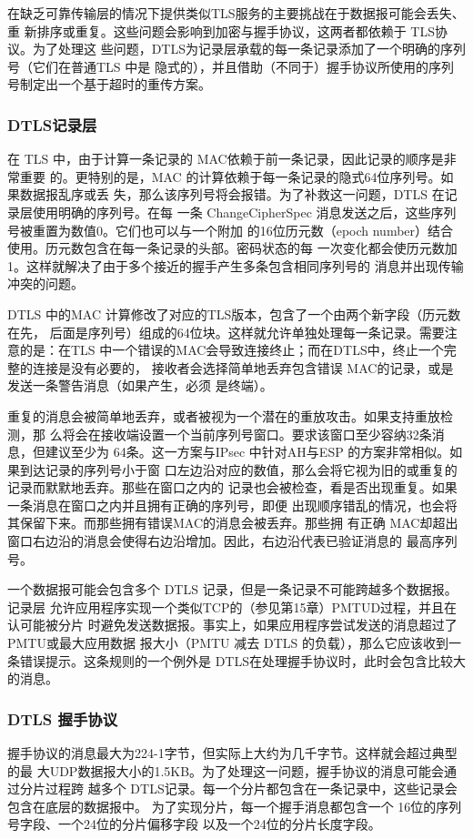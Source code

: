 在缺乏可靠传输层的情况下提供类似TLS服务的主要挑战在于数据报可能会丢失、重
新排序或重复。这些问题会影响到加密与握手协议，这两者都依赖于 TLS协议。为了处理这
些问题，DTLS为记录层承载的每一条记录添加了一个明确的序列号（它们在普通TLS 中是
隐式的），并且借助（不同于）握手协议所使用的序列号制定出一个基于超时的重传方案。
\subsubsection{DTLS记录层}
在 TLS 中，由于计算一条记录的 MAC依赖于前一条记录，因此记录的顺序是非常重要
的。更特别的是，MAC 的计算依赖于每一条记录的隐式64位序列号。如果数据报乱序或丢
失，那么该序列号将会报错。为了补救这一问题，DTLS 在记录层使用明确的序列号。在每
一条 ChangeCipherSpec 消息发送之后，这些序列号被重置为数值0。它们也可以与一个附加
的16位历元数（epoch number）结合使用。历元数包含在每一条记录的头部。密码状态的每
一次变化都会使历元数加1。这样就解决了由于多个接近的握手产生多条包含相同序列号的
消息并出现传输冲突的问题。

DTLS 中的MAC 计算修改了对应的TLS版本，包含了一个由两个新字段（历元数在先，
后面是序列号）组成的64位块。这样就允许单独处理每一条记录。需要注意的是：在TLS
中一个错误的MAC会导致连接终止；而在DTLS中，终止一个完整的连接是没有必要的，
接收者会选择简单地丢弃包含错误 MAC的记录，或是发送一条警告消息（如果产生，必须
是终端）。

重复的消息会被简单地丢弃，或者被视为一个潜在的重放攻击。如果支持重放检测，那
么将会在接收端设置一个当前序列号窗口。要求该窗口至少容纳32条消息，但建议至少为
64条。这一方案与IPsec 中针对AH与ESP 的方案非常相似。如果到达记录的序列号小于窗
口左边沿对应的数值，那么会将它视为旧的或重复的记录而默默地丢弃。那些在窗口之内的
记录也会被检查，看是否出现重复。如果一条消息在窗口之内并且拥有正确的序列号，即便
出现顺序错乱的情况，也会将其保留下来。而那些拥有错误MAC的消息会被丢弃。那些拥
有正确 MAC却超出窗口右边沿的消息会使得右边沿增加。因此，右边沿代表已验证消息的
最高序列号。

一个数据报可能会包含多个 DTLS 记录，但是一条记录不可能跨越多个数据报。记录层
允许应用程序实现一个类似TCP的（参见第15章）PMTUD过程，并且在认可能被分片
时避免发送数据报。事实上，如果应用程序尝试发送的消息超过了PMTU或最大应用数据
报大小（PMTU 减去 DTLS 的负载），那么它应该收到一条错误提示。这条规则的一个例外是
DTLS在处理握手协议时，此时会包含比较大的消息。

\subsubsection{DTLS 握手协议}
握手协议的消息最大为224-1字节，但实际上大约为几千字节。这样就会超过典型的最
大UDP数据报大小的1.5KB。为了处理这一问题，握手协议的消息可能会通过分片过程跨
越多个 DTLS记录。每一个分片都包含在一条记录中，这些记录会包含在底层的数据报中。
为了实现分片，每一个握手消息都包含一个 16位的序列号字段、一个24位的分片偏移字段
以及一个24位的分片长度字段。

